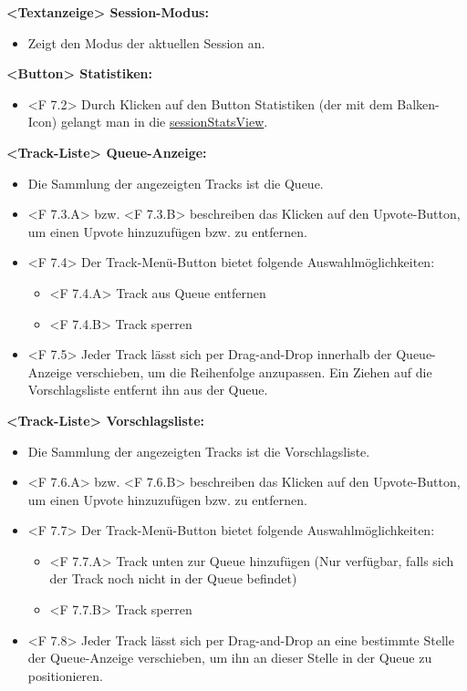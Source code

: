 \documentclass[oneside, ngerman]{sdqtechreport}
\begin{document}
\textbf{<Textanzeige> Session-Modus:}
\begin{itemize}
    \item Zeigt den Modus der aktuellen Session an.
\end{itemize}

\textbf{<Button> Statistiken:}
\begin{itemize}
    \item <F 7.2> Durch Klicken auf den Button Statistiken (der mit dem Balken-Icon) gelangt man in die \hyperlink{sessionStatsView}{sessionStatsView}.
\end{itemize}

\textbf{<Track-Liste> Queue-Anzeige:}
\begin{itemize}
    \item Die Sammlung der angezeigten Tracks ist die Queue.
    \item <F 7.3.A> bzw. <F 7.3.B> beschreiben das Klicken auf den Upvote-Button, um einen Upvote hinzuzufügen bzw. zu entfernen.
    \item <F 7.4> Der Track-Menü-Button bietet folgende Auswahlmöglichkeiten:
    \begin{itemize}
        \hypertarget{<F 7.4.A>}{}
        \item <F 7.4.A> Track aus Queue entfernen
        \hypertarget{<F 7.4.B>}{}
        \item <F 7.4.B> Track sperren
    \end{itemize}
    \hypertarget{<F 7.5>}{}
    \item <F 7.5> Jeder Track lässt sich per Drag-and-Drop innerhalb der Queue-Anzeige verschieben, um die Reihenfolge anzupassen. Ein Ziehen auf die Vorschlagsliste entfernt ihn aus der Queue.
\end{itemize}

\textbf{<Track-Liste> Vorschlagsliste:}
\begin{itemize}
    \item Die Sammlung der angezeigten Tracks ist die Vorschlagsliste.
    \hypertarget{<F 7.6.A>}{}
    \hypertarget{<F 7.6.B>}{}
    \item <F 7.6.A> bzw. <F 7.6.B> beschreiben das Klicken auf den Upvote-Button, um einen Upvote hinzuzufügen bzw. zu entfernen.
    \hypertarget{<F 7.7>}{}
    \item <F 7.7> Der Track-Menü-Button bietet folgende Auswahlmöglichkeiten:
    \begin{itemize}
        \hypertarget{<F 7.7.A>}{}
        \item <F 7.7.A> Track unten zur Queue hinzufügen (Nur verfügbar, falls sich der Track noch nicht in der Queue befindet)
        \hypertarget{<F 7.7.B>}{}
        \item <F 7.7.B> Track sperren
    \end{itemize}
    \hypertarget{<F 7.8>}{}
    \item <F 7.8> Jeder Track lässt sich per Drag-and-Drop an eine bestimmte Stelle der Queue-Anzeige verschieben, um ihn an dieser Stelle in der Queue zu positionieren.
\end{itemize}
\end{document}
